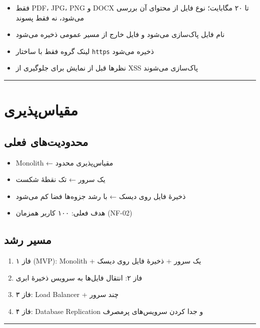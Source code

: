 \documentclass[12pt, a4paper]{article}
\begin{document}
\begin{itemize}
\tightlist
\item
  فقط PDF، JPG، PNG و DOCX تا ۲۰ مگابایت؛ نوع فایل از محتوای آن بررسی می‌شود، نه فقط پسوند
\item
  نام فایل پاک‌سازی می‌شود و فایل خارج از مسیر عمومی ذخیره می‌شود
\item
  لینک گروه فقط با ساختار \texttt{https} ذخیره می‌شود
\item
  نظرها قبل از نمایش برای جلوگیری از XSS پاک‌سازی می‌شوند
\end{itemize}

\begin{center}\rule{0.5\linewidth}{0.5pt}\end{center}

\section{مقیاس‌پذیری}

\subsection{محدودیت‌های فعلی}

\begin{itemize}
\tightlist
\item
  Monolith ← مقیاس‌پذیری محدود
\item
  یک سرور ← تک نقطهٔ شکست
\item
  ذخیرهٔ فایل روی دیسک ← با رشد جزوه‌ها فضا کم می‌شود
\item
  هدف فعلی: ۱۰۰ کاربر همزمان (NF-02)
\end{itemize}

\subsection{مسیر رشد}

\begin{enumerate}
\def\labelenumi{\arabic{enumi}.}
\tightlist
\item
  فاز ۱ (MVP): Monolith + یک سرور + ذخیرهٔ فایل روی دیسک
\item
  فاز ۲: انتقال فایل‌ها به سرویس ذخیرهٔ ابری
\item
  فاز ۳: Load Balancer + چند سرور
\item
  فاز ۴: Database Replication و جدا کردن سرویس‌های پرمصرف
\end{enumerate}

\begin{center}\rule{0.5\linewidth}{0.5pt}\end{center}
\end{document}
